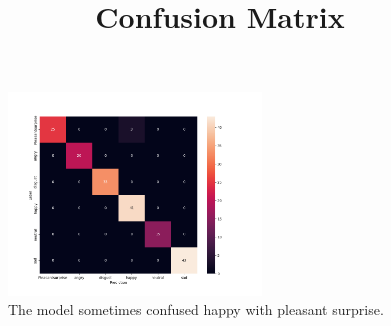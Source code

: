 \documentclass{article}
\begin{document}
\begin{figure}[H]
  \centering
  \includegraphics[width=0.6\textwidth]{../figs/confusion_matrix.png}
  \title{Confusion Matrix}
  \caption{The model sometimes confused happy with pleasant surprise.}
\end{figure}


\newpage
\printbibliography
\end{document}
